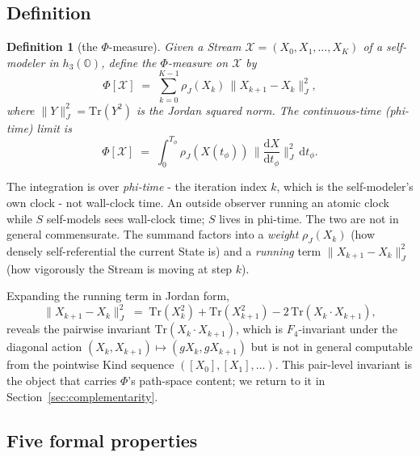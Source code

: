 \documentclass[12pt]{article}
\newtheorem{definition}[theorem]{Definition}
\theoremstyle{remark}
\newcommand{\hthree}{h_3(\mathbb{O})}
\newcommand{\Ffour}{F_4}
\newcommand{\rhoJ}{\rho_J}
\newcommand{\Phiexp}{\Phi}
\newcommand{\Stream}{\mathcal{X}}
\newcommand{\Tr}{\mathrm{Tr}}
\newcommand{\Jnorm}[1]{\lVert #1 \rVert_J}
\begin{document}
\subsection{Definition}
\label{sec:phi-definition}

\begin{definition}[the $\Phiexp$-measure]\label{def:phi}
Given a Stream $\Stream = (X_0, X_1, \ldots, X_K)$ of a self-modeler in
$\hthree$, define the $\Phiexp$-measure on $\Stream$ by
\begin{equation}\label{eq:phi-definition}
  \Phiexp[\Stream] \;=\; \sum_{k=0}^{K-1} \rhoJ(X_k)\,\Jnorm{X_{k+1} - X_k}^2,
\end{equation}
where $\Jnorm{Y}^2 = \Tr(Y^2)$ is the Jordan squared norm. The
continuous-time (phi-time) limit is
\begin{equation}\label{eq:phi-continuous}
  \Phiexp[\Stream] \;=\; \int_0^{T_\phi} \rhoJ(X(t_\phi))\,
    \Big\lVert \frac{\mathrm{d}X}{\mathrm{d}t_\phi} \Big\rVert_J^2 \,\mathrm{d}t_\phi.
\end{equation}
\end{definition}

The integration is over \emph{phi-time} - the iteration index $k$,
which is the self-modeler's own clock - not wall-clock time. An outside
observer running an atomic clock while $S$ self-models sees wall-clock
time; $S$ lives in phi-time. The two are not in general commensurate.
The summand factors into a \emph{weight} $\rhoJ(X_k)$ (how densely
self-referential the current State is) and a \emph{running} term
$\Jnorm{X_{k+1} - X_k}^2$ (how vigorously the Stream is moving at
step $k$).

Expanding the running term in Jordan form,
\begin{equation}\label{eq:running-expansion}
  \Jnorm{X_{k+1} - X_k}^2 \;=\; \Tr(X_k^2) + \Tr(X_{k+1}^2) - 2\,\Tr(X_k \cdot X_{k+1}),
\end{equation}
reveals the pairwise invariant $\Tr(X_k \cdot X_{k+1})$, which is
$\Ffour$-invariant under the diagonal action
$(X_k, X_{k+1}) \mapsto (g X_k, g X_{k+1})$ but is not in general
computable from the pointwise Kind sequence $([X_0], [X_1], \ldots)$.
This pair-level invariant is the object that carries $\Phiexp$'s
path-space content; we return to it in Section~\ref{sec:complementarity}.

\subsection{Five formal properties}
\label{sec:phi-properties}
\end{document}
